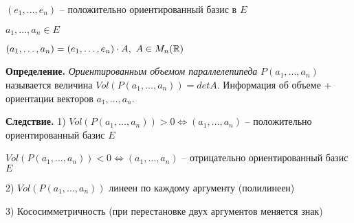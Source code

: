 $(e_1, \dots, e_n)$ -- положительно ориентированный базис в $E$

\vspace{\baselineskip}
$a_1, \dots, a_n \in E$

$(a_1, \dots, a_n) = (e_1, \dots, e_n) \cdot A, \ A \in M_n(\mathbb{R})$

\vspace{\baselineskip}
\textbf{Определение.} \textit{Ориентированным объемом параллелепипеда} $P(a_1, \dots, a_n)$ называется величина $Vol(P(a_1, \dots, a_n)) = det A$. Информация об объеме + ориентации векторов $a_1, \dots, a_n$.

\vspace{\baselineskip}
\textbf{Следствие.} 1) $Vol(P(a_1, \dots, a_n)) > 0 \Leftrightarrow (a_1, \dots, a_n)$ -- положительно ориентированный базис $E$

$Vol(P(a_1, \dots, a_n)) < 0 \Leftrightarrow (a_1, \dots, a_n)$ -- отрицательно ориентированный базис $E$

2) $Vol(P(a_1, \dots, a_n))$ линеен по каждому аргументу (полилинеен)

3) Кососимметричность (при перестановке двух аргументов меняется знак)

